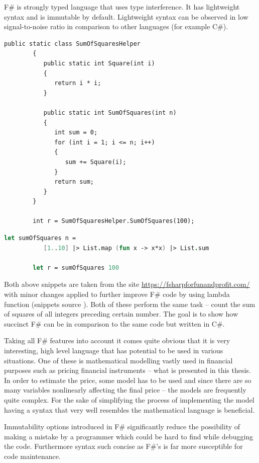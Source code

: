     F\# is strongly typed language that uses type interference. It has lightweight syntax and is immutable by default. Lightweight syntax can be observed in low signal-to-noise ratio in comparison to other languages (for example C\#).
    
    \begin{lstlisting}[caption=C\# code example]
        public static class SumOfSquaresHelper
        {
           public static int Square(int i)
           {
              return i * i;
           }
    
           public static int SumOfSquares(int n)
           {
              int sum = 0;
              for (int i = 1; i <= n; i++)
              {
                 sum += Square(i);
              }
              return sum;
           }
        }
        
        int r = SumOfSquaresHelper.SumOfSquares(100);
    \end{lstlisting}
    
    \begin{lstlisting}[language=FSharp, caption=F\# code example]
        let sumOfSquares n = 
           [1..10] |> List.map (fun x -> x*x) |> List.sum
        
        let r = sumOfSquares 100
    \end{lstlisting}
    
    Both above snippets are taken from the site \url{https://fsharpforfunandprofit.com/} with minor changes applied to further improve F\# code by using lambda function (snippets source \cite{compareCandF}). Both of these perform the same task -- count the sum of squares of all integers preceding certain number. The goal is to show how succinct F\# can be in comparison to the same code but written in C\#.
    
    Taking all F\# features into account it comes quite obvious that it is very interesting, high level language that has potential to be used in various situations. One of these is mathematical modelling vastly used in financial purposes such as pricing financial instruments -- what is presented in this thesis. In order to estimate the price, some model has to be used and since there are so many variables nonlinearly affecting the final price -- the models are frequently quite complex. For the sake of simplifying the process of implementing the model having a syntax that very well resembles the mathematical language is beneficial.
    
    Immutability options introduced in F\# significantly reduce the possibility of making a mistake by a programmer which could be hard to find while debugging the code. Furthermore syntax such concise as F\#'s is far more susceptible for code maintenance.
    
